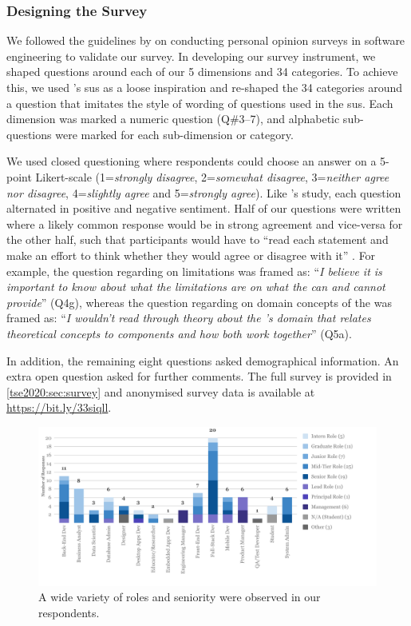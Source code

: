 \subsubsection{Designing the Survey}

We followed the guidelines by \citet{Kitchenham:2007ux} on conducting personal opinion surveys in software engineering to validate our survey. In developing our survey instrument, we  shaped questions around each of our 5 dimensions and 34 categories. To achieve this, we used \citeauthor{Brooke:1996ua}'s \gls{sus} \citep{Brooke:1996ua} as a loose inspiration and re-shaped the 34 categories around a question that imitates the style of wording of questions used in the \gls{sus}. Each dimension was marked a numeric question (Q\#3--7), and alphabetic sub-questions were marked for each sub-dimension or category.

We used closed questioning where respondents could choose an answer on a 5-point Likert-scale (1=\textit{strongly disagree}, 2=\textit{somewhat disagree}, 3=\textit{neither agree nor disagree}, 4=\textit{slightly agree} and 5=\textit{strongly agree}).  Like \citeauthor{Brooke:1996ua}'s study, each question alternated in positive and negative sentiment. Half of our questions were written where a likely common response would be in strong agreement and vice-versa for the other half, such that participants would have to ``read each statement and make an effort to think whether they would agree or disagree with it'' \citep{Brooke:1996ua}. For example, the question regarding  on  limitations was framed as: ``\textit{I believe it is important to know about what the limitations are on what the  can and cannot provide}'' (Q4g), whereas the question regarding  on domain concepts of the  was framed as: ``\textit{I wouldn't read through theory about the 's domain that relates theoretical concepts to  components and how both work together}'' (Q5a).

In addition, the remaining eight questions asked demographical information. An extra open question asked for further comments. The full survey is provided in \cref{tse2020:sec:survey} and anonymised survey data is available at \mbox{\url{https://bit.ly/33siqll}}.

\begin{figure}[t]
\centering
\includegraphics[width=\linewidth]{roles-and-seniority.pdf}
\caption[Roles and seniority from survey participants]{A wide variety of roles and seniority were observed in our respondents.}
\label{tse2020:fig:roles-and-seniority}
\end{figure}

